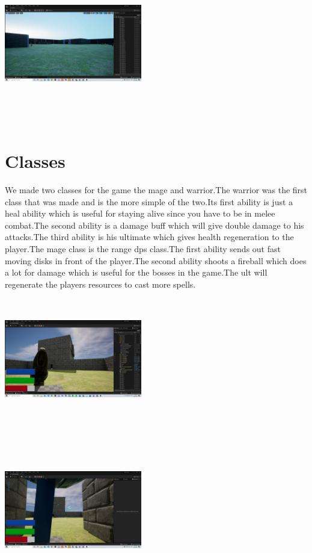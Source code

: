 \documentclass{sigchi}
\begin{document}
\includegraphics[width=6cm, height=6cm]{Figure/fort.png} \\ \\   

\section{Classes}
We made two classes for the game the mage and warrior.The warrior was the first class that was made and is the more simple of the two.Its first ability is just a heal ability which is useful for staying alive since you have to be in melee combat.The second ability is a damage buff which will give double damage to his attacks.The third ability is his ultimate which gives health regeneration to the player.The mage class is the range dps class.The first ability sends out fast moving disks in front of the player.The second ability shoots a fireball which does a lot for damage which is useful for the bosses in the game.The ult will regenerate  the players resources to cast more spells. \\
\includegraphics[width=6cm, height=6cm]{Figure/hammer.png}\\ \\   
\includegraphics[width=6cm, height=6cm]{Figure/mage.png}\\ \\   
\end{document}
